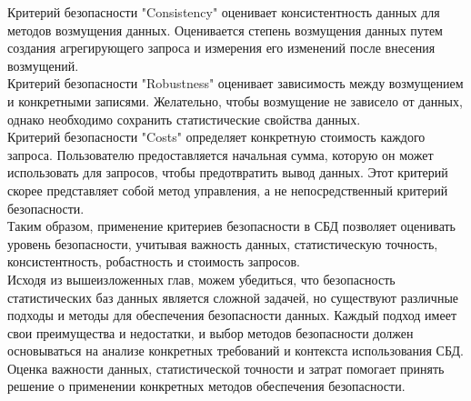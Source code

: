 Критерий безопасности "Consistency" оценивает консистентность данных для методов возмущения данных. Оценивается степень возмущения данных путем создания агрегирующего запроса и измерения его изменений после внесения возмущений. 
\\

Критерий безопасности "Robustness" оценивает зависимость между возмущением и конкретными записями. Желательно, чтобы возмущение не зависело от данных, однако необходимо сохранить статистические свойства данных.
\\

Критерий безопасности "Costs" определяет конкретную стоимость каждого запроса. Пользователю предоставляется начальная сумма, которую он может использовать для запросов, чтобы предотвратить вывод данных. Этот критерий скорее представляет собой метод управления, а не непосредственный критерий безопасности.
\\

Таким образом, применение критериев безопасности в СБД позволяет оценивать уровень безопасности, учитывая важность данных, статистическую точность, консистентность, робастность и стоимость запросов.
\\

Исходя из вышеизложенных глав, можем убедиться, что безопасность статистических баз данных является сложной задачей, но существуют различные подходы и методы для обеспечения безопасности данных. Каждый подход имеет свои преимущества и недостатки, и выбор методов безопасности должен основываться на анализе конкретных требований и контекста использования СБД. Оценка важности данных, статистической точности и затрат помогает принять решение о применении конкретных методов обеспечения безопасности.

